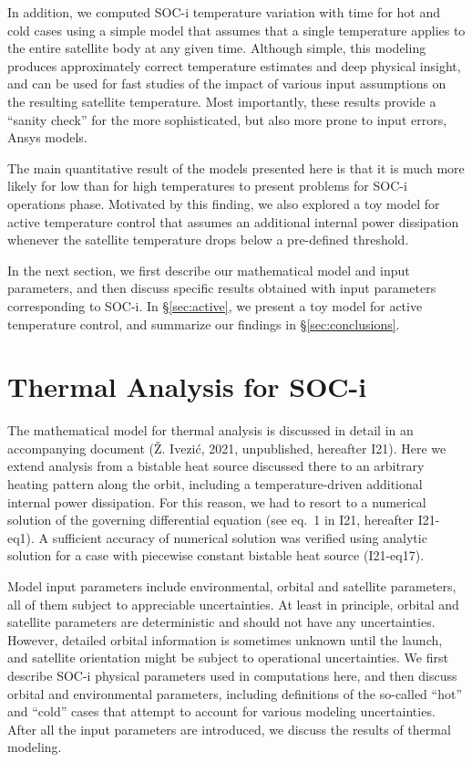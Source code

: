 \documentclass[]{aastex62}
\begin{document}
In addition, we computed SOC-i temperature variation with time for hot and cold cases using
a simple model that assumes that a single temperature applies to the entire satellite body 
at any given time. Although simple, this modeling produces approximately correct temperature
estimates and deep physical insight, and can be used for fast studies of the impact of various
input assumptions on the resulting satellite temperature. Most importantly, these results 
provide a ``sanity check'' for the more sophisticated, but also more prone to input errors, 
Ansys models.
 
The main quantitative result of the models presented here is that it is much more likely 
for low than for high temperatures to present problems for SOC-i operations phase. 
Motivated by this finding, we also explored a toy model for active temperature control that 
assumes an additional internal power dissipation whenever the satellite temperature
drops below a pre-defined threshold. 

In the next section, we first describe our mathematical model and input parameters, and then 
discuss specific results obtained with input parameters corresponding to SOC-i. In \S\ref{sec:active},
we present a toy model for active temperature control, and summarize our findings in \S\ref{sec:conclusions}. 



\section{Thermal Analysis for SOC-i} 

The mathematical model for thermal analysis is discussed in detail in an accompanying document 
(\v{Z}. Ivezi\'{c}, 2021, unpublished, hereafter I21).  Here we extend analysis from a bistable heat source
discussed there to an arbitrary heating pattern along the orbit, including a temperature-driven
additional internal power dissipation. For this reason, we had to resort to a numerical solution
of the governing differential equation (see eq.~1 in I21, hereafter I21-eq1). A sufficient accuracy of numerical 
solution was verified using analytic solution for a case with piecewise constant bistable heat source (I21-eq17). 

Model input parameters include environmental, orbital and satellite parameters, all of them
subject to appreciable uncertainties. At least in principle, orbital and satellite parameters 
are deterministic and should not have any uncertainties. However, detailed orbital information
is sometimes unknown until the launch, and satellite orientation might be subject to 
operational uncertainties. We first describe SOC-i physical parameters used in computations
here, and then discuss orbital and environmental parameters, including definitions of the 
so-called ``hot'' and ``cold'' cases that attempt to account for various modeling uncertainties. 
After all the input parameters are introduced, we discuss the results of thermal modeling. 
 
\end{document}
